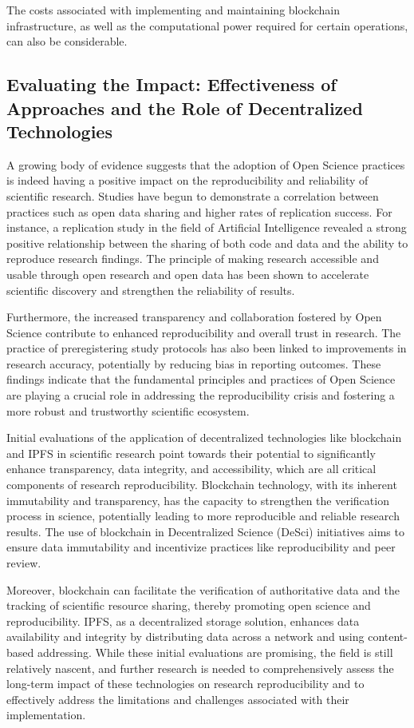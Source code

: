 \documentclass{article}
\begin{document}
The costs associated with implementing and maintaining blockchain infrastructure, as well as the computational power required for certain operations, can also be considerable.

\subsection{Evaluating the Impact: Effectiveness of Approaches and the Role of Decentralized Technologies}

A growing body of evidence suggests that the adoption of Open Science practices is indeed having a positive impact on the reproducibility and reliability of scientific research. Studies have begun to demonstrate a correlation between practices such as open data sharing and higher rates of replication success. For instance, a replication study in the field of Artificial Intelligence revealed a strong positive relationship between the sharing of both code and data and the ability to reproduce research findings. The principle of making research accessible and usable through open research and open data has been shown to accelerate scientific discovery and strengthen the reliability of results.

Furthermore, the increased transparency and collaboration fostered by Open Science contribute to enhanced reproducibility and overall trust in research. The practice of preregistering study protocols has also been linked to improvements in research accuracy, potentially by reducing bias in reporting outcomes. These findings indicate that the fundamental principles and practices of Open Science are playing a crucial role in addressing the reproducibility crisis and fostering a more robust and trustworthy scientific ecosystem.

Initial evaluations of the application of decentralized technologies like blockchain and IPFS in scientific research point towards their potential to significantly enhance transparency, data integrity, and accessibility, which are all critical components of research reproducibility. Blockchain technology, with its inherent immutability and transparency, has the capacity to strengthen the verification process in science, potentially leading to more reproducible and reliable research results. The use of blockchain in Decentralized Science (DeSci) initiatives aims to ensure data immutability and incentivize practices like reproducibility and peer review.

Moreover, blockchain can facilitate the verification of authoritative data and the tracking of scientific resource sharing, thereby promoting open science and reproducibility. IPFS, as a decentralized storage solution, enhances data availability and integrity by distributing data across a network and using content-based addressing. While these initial evaluations are promising, the field is still relatively nascent, and further research is needed to comprehensively assess the long-term impact of these technologies on research reproducibility and to effectively address the limitations and challenges associated with their implementation.
\end{document}
